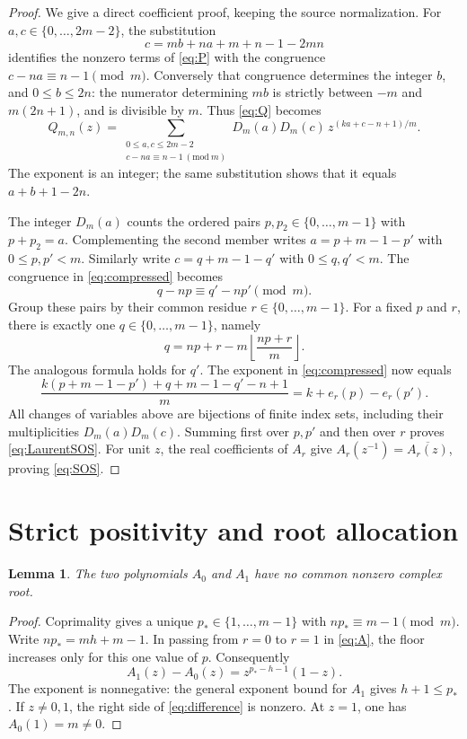 \documentclass[11pt]{article}
\newtheorem{lemma}[theorem]{Lemma}
\begin{document}
\begin{proof}
We give a direct coefficient proof, keeping the source normalization.
For $a,c\in\{0,\ldots,2m-2\}$, the substitution
\[
 c=mb+na+m+n-1-2mn
\]
identifies the nonzero terms of \eqref{eq:P} with the congruence
$c-na\equiv n-1\pmod m$. Conversely that congruence determines the
integer $b$, and $0\leq b\leq2n$: the numerator determining $mb$
is strictly between $-m$ and $m(2n+1)$, and is divisible by $m$.
Thus \eqref{eq:Q} becomes
\begin{equation}\label{eq:compressed}
 Q_{m,n}(z)=
 \sum_{\substack{0\leq a,c\leq2m-2\\c-na\equiv n-1\ (\mathrm{mod}\ m)}}
 D_m(a)D_m(c)\,
 z^{(ka+c-n+1)/m}.
\end{equation}
The exponent is an integer; the same substitution shows that it equals
$a+b+1-2n$.

The integer $D_m(a)$ counts the ordered pairs $p,p_2\in\{0,\ldots,m-1\}$
with $p+p_2=a$. Complementing the second member writes
$a=p+m-1-p'$ with $0\leq p,p'<m$. Similarly write
$c=q+m-1-q'$ with $0\leq q,q'<m$. The congruence in
\eqref{eq:compressed} becomes
\begin{equation}\label{eq:residue}
 q-np\equiv q'-np'\pmod m.
\end{equation}
Group these pairs by their common residue $r\in\{0,\ldots,m-1\}$.
For a fixed $p$ and $r$, there is exactly one $q\in\{0,\ldots,m-1\}$,
namely
\[
 q=np+r-m\left\lfloor\frac{np+r}{m}\right\rfloor.
\]
The analogous formula holds for $q'$. The exponent in
\eqref{eq:compressed} now equals
\[
 \frac{k(p+m-1-p')+q+m-1-q'-n+1}{m}
 =k+e_r(p)-e_r(p').
\]
All changes of variables above are bijections of finite index sets,
including their multiplicities $D_m(a)D_m(c)$. Summing first over
$p,p'$ and then over $r$ proves \eqref{eq:LaurentSOS}.
For unit $z$, the real coefficients of $A_r$ give
$A_r(z^{-1})=\overline{A_r(z)}$, proving \eqref{eq:SOS}.
\end{proof}

\section{Strict positivity and root allocation}
\begin{lemma}\label{lem:strict}
The two polynomials $A_0$ and $A_1$ have no common nonzero complex root.
\end{lemma}
\begin{proof}
Coprimality gives a unique $p_*\in\{1,\ldots,m-1\}$ with
$np_*\equiv m-1\pmod m$. Write
$np_*=mh+m-1$. In passing from $r=0$ to $r=1$ in
\eqref{eq:A}, the floor increases only for this one value of $p$.
Consequently
\begin{equation}\label{eq:difference}
 A_1(z)-A_0(z)=z^{p_*-h-1}(1-z).
\end{equation}
The exponent is nonnegative: the general exponent bound for $A_1$
gives $h+1\leq p_*$. If $z\ne0,1$, the right side of
\eqref{eq:difference} is nonzero. At $z=1$, one has $A_0(1)=m\ne0$.
\end{proof}
\end{document}
